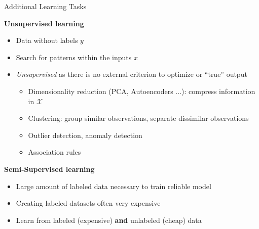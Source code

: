 \documentclass[11pt,compress,t,notes=noshow, xcolor=table]{beamer}
\begin{document}


\begin{vbframe}{Additional Learning Tasks}

\lz

\textbf{Unsupervised learning}

\begin{itemize}

  \item Data without labels $y$
  
  \item Search for patterns within the inputs $x$
  
  \item \textit{Unsupervised} as there is no external criterion to optimize or 
  \enquote{true} output
  
  \begin{itemize}
  
    \item Dimensionality reduction (PCA, Autoencoders ...): compress 
    information in $\mathcal X$
    
    \item Clustering: group similar observations, separate dissimilar 
    observations
    
    \item Outlier detection, anomaly detection
    
    \item Association rules
  
  \end{itemize}

\end{itemize}
    
\framebreak

\lz

\textbf{Semi-Supervised learning}

\begin{itemize}

  \item Large amount of labeled data necessary to train reliable model
  
  \item Creating labeled datasets often very expensive
  
  \item Learn from labeled (expensive) \textbf{and} unlabeled (cheap) data
  

\end{itemize}
\end{vbframe}
\end{document}
